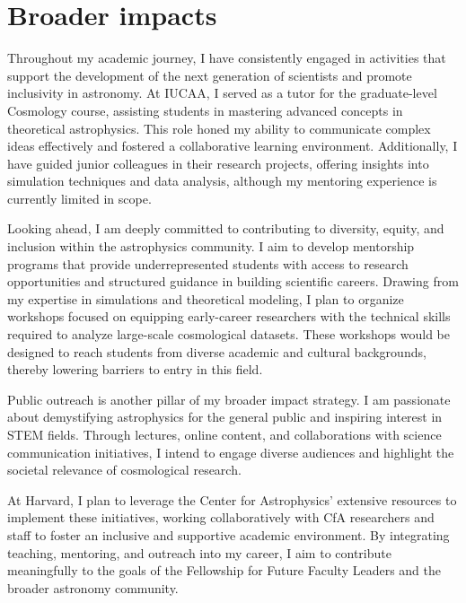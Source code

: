 \documentclass[10pt]{article}
\begin{document}
\newpage
\section{Broader impacts}

Throughout my academic journey, I have consistently engaged in activities that support the development of the next generation of scientists and promote inclusivity in astronomy. At IUCAA, I served as a tutor for the graduate-level Cosmology course, assisting students in mastering advanced concepts in theoretical astrophysics. This role honed my ability to communicate complex ideas effectively and fostered a collaborative learning environment. Additionally, I have guided junior colleagues in their research projects, offering insights into simulation techniques and data analysis, although my mentoring experience is currently limited in scope.

Looking ahead, I am deeply committed to contributing to diversity, equity, and inclusion within the astrophysics community. I aim to develop mentorship programs that provide underrepresented students with access to research opportunities and structured guidance in building scientific careers. Drawing from my expertise in simulations and theoretical modeling, I plan to organize workshops focused on equipping early-career researchers with the technical skills required to analyze large-scale cosmological datasets. These workshops would be designed to reach students from diverse academic and cultural backgrounds, thereby lowering barriers to entry in this field.

Public outreach is another pillar of my broader impact strategy. I am passionate about demystifying astrophysics for the general public and inspiring interest in STEM fields. Through lectures, online content, and collaborations with science communication initiatives, I intend to engage diverse audiences and highlight the societal relevance of cosmological research.

At Harvard, I plan to leverage the Center for Astrophysics' extensive resources to implement these initiatives, working collaboratively with CfA researchers and staff to foster an inclusive and supportive academic environment. By integrating teaching, mentoring, and outreach into my career, I aim to contribute meaningfully to the goals of the Fellowship for Future Faculty Leaders and the broader astronomy community.
\end{document}
